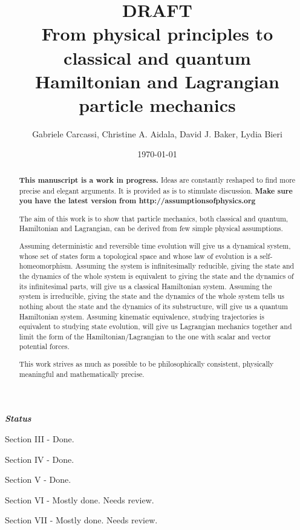 \documentclass[aps,pra,10pt,twocolumn,floatfix,nofootinbib]{revtex4-1}
\numberwithin{equation}{section}
\theoremstyle{definition}
\begin{document}
\title{DRAFT \\ From physical principles to classical and quantum \\ Hamiltonian and Lagrangian particle mechanics}
\author{Gabriele Carcassi, Christine A. Aidala, David J. Baker, Lydia Bieri}
\date{\today}

\begin{abstract}
\textbf{This manuscript is a work in progress.} Ideas are constantly reshaped to find more precise and elegant arguments. It is provided as is to stimulate discussion.  \textbf{Make sure you have the latest version from http://assumptionsofphysics.org}

The aim of this work is to show that particle mechanics, both classical and quantum, Hamiltonian and Lagrangian, can be derived from few simple physical assumptions.

Assuming deterministic and reversible time evolution will give us a dynamical system, whose set of states form a topological space and whose law of evolution is a self-homeomorphism. Assuming the system is infinitesimally reducible, giving the state and the dynamics of the whole system is equivalent to giving the state and the dynamics of its infinitesimal parts, will give us a classical Hamiltonian system. Assuming the system is irreducible, giving the state and the dynamics of the whole system tells us nothing about the state and the dynamics of its substructure, will give us a quantum Hamiltonian system. Assuming kinematic equivalence, studying trajectories is equivalent to studying state evolution, will give us Lagrangian mechanics together and limit the form of the Hamiltonian/Lagrangian to the one with scalar and vector potential forces.

This work strives as much as possible to be philosophically consistent, physically meaningful and mathematically precise.
\end{abstract}
\maketitle

\textbf{\emph{Status}}

Section III - Done.

Section IV - Done.

Section V - Done.

Section VI - Mostly done. Needs review.

Section VII - Mostly done. Needs review.
\end{document}
